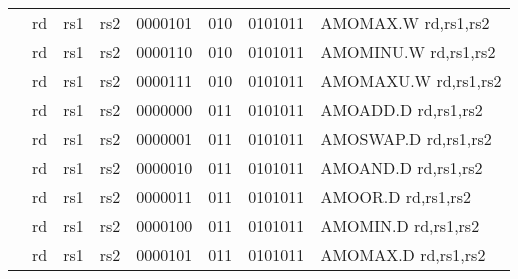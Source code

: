 \begin{table}[p]
\begin{small}
\begin{center}
\begin{tabular}{rccccccccccl}
&
\multicolumn{1}{|c|}{rd} &
\multicolumn{1}{c|}{rs1} &
\multicolumn{1}{c|}{rs2} &
\multicolumn{4}{c|}{0000101} &
\multicolumn{2}{c|}{010} &
\multicolumn{1}{c|}{0101011} & AMOMAX.W rd,rs1,rs2 \\
\cline{2-11}
  

&
\multicolumn{1}{|c|}{rd} &
\multicolumn{1}{c|}{rs1} &
\multicolumn{1}{c|}{rs2} &
\multicolumn{4}{c|}{0000110} &
\multicolumn{2}{c|}{010} &
\multicolumn{1}{c|}{0101011} & AMOMINU.W rd,rs1,rs2 \\
\cline{2-11}
  

&
\multicolumn{1}{|c|}{rd} &
\multicolumn{1}{c|}{rs1} &
\multicolumn{1}{c|}{rs2} &
\multicolumn{4}{c|}{0000111} &
\multicolumn{2}{c|}{010} &
\multicolumn{1}{c|}{0101011} & AMOMAXU.W rd,rs1,rs2 \\
\cline{2-11}
  

&
\multicolumn{1}{|c|}{rd} &
\multicolumn{1}{c|}{rs1} &
\multicolumn{1}{c|}{rs2} &
\multicolumn{4}{c|}{0000000} &
\multicolumn{2}{c|}{011} &
\multicolumn{1}{c|}{0101011} & AMOADD.D rd,rs1,rs2 \\
\cline{2-11}
  

&
\multicolumn{1}{|c|}{rd} &
\multicolumn{1}{c|}{rs1} &
\multicolumn{1}{c|}{rs2} &
\multicolumn{4}{c|}{0000001} &
\multicolumn{2}{c|}{011} &
\multicolumn{1}{c|}{0101011} & AMOSWAP.D rd,rs1,rs2 \\
\cline{2-11}
  

&
\multicolumn{1}{|c|}{rd} &
\multicolumn{1}{c|}{rs1} &
\multicolumn{1}{c|}{rs2} &
\multicolumn{4}{c|}{0000010} &
\multicolumn{2}{c|}{011} &
\multicolumn{1}{c|}{0101011} & AMOAND.D rd,rs1,rs2 \\
\cline{2-11}
  

&
\multicolumn{1}{|c|}{rd} &
\multicolumn{1}{c|}{rs1} &
\multicolumn{1}{c|}{rs2} &
\multicolumn{4}{c|}{0000011} &
\multicolumn{2}{c|}{011} &
\multicolumn{1}{c|}{0101011} & AMOOR.D rd,rs1,rs2 \\
\cline{2-11}
  

&
\multicolumn{1}{|c|}{rd} &
\multicolumn{1}{c|}{rs1} &
\multicolumn{1}{c|}{rs2} &
\multicolumn{4}{c|}{0000100} &
\multicolumn{2}{c|}{011} &
\multicolumn{1}{c|}{0101011} & AMOMIN.D rd,rs1,rs2 \\
\cline{2-11}
  

&
\multicolumn{1}{|c|}{rd} &
\multicolumn{1}{c|}{rs1} &
\multicolumn{1}{c|}{rs2} &
\multicolumn{4}{c|}{0000101} &
\multicolumn{2}{c|}{011} &
\multicolumn{1}{c|}{0101011} & AMOMAX.D rd,rs1,rs2 \\
\cline{2-11}
  


\end{tabular}
\end{center}
\end{small}
\end{table}
